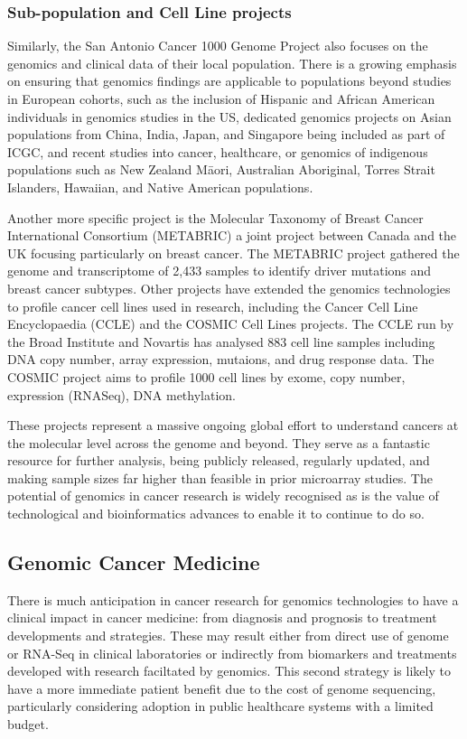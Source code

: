 \subsubsection{Sub-population and Cell Line projects}
Similarly, the San Antonio Cancer 1000 Genome Project also focuses on the genomics and clinical data of their local population. There is a growing emphasis on ensuring that genomics findings are applicable to populations beyond studies in European cohorts, such as the inclusion of Hispanic and African American individuals in genomics studies in the US, dedicated genomics projects on Asian populations from China, India, Japan, and Singapore being included as part of ICGC, and recent studies into cancer, healthcare, or genomics of indigenous populations such as New Zealand  M\={a}ori, Australian Aboriginal, Torres Strait Islanders, Hawaiian, and Native American populations. 

Another more specific project is the Molecular Taxonomy of Breast Cancer International Consortium (METABRIC) a joint project between Canada and the UK focusing particularly on breast cancer. The METABRIC project gathered the genome and transcriptome of 2,433 samples to identify driver mutations and breast cancer subtypes. Other projects have extended the genomics technologies to profile cancer cell lines used in research, including the Cancer Cell Line Encyclopaedia (CCLE) and the COSMIC Cell Lines projects. The CCLE run by the Broad Institute and Novartis has analysed 883 cell line samples including DNA copy number, array expression, mutaions, and  drug response data. The COSMIC project aims to profile 1000 cell lines by exome, copy number, expression (RNASeq), DNA methylation.

These projects represent a massive ongoing global effort to understand cancers at the molecular level across the genome and beyond. They serve as a fantastic resource for further analysis, being publicly released, regularly updated, and making sample sizes far higher than feasible in prior microarray studies. The potential of genomics in cancer research is widely recognised as is the value of technological and bioinformatics advances to enable it to continue to do so. 


\subsection{Genomic Cancer Medicine}
There is much anticipation in cancer research for genomics technologies to have a clinical impact in cancer medicine: from diagnosis and prognosis to treatment developments and strategies. These may result either from direct use of genome or RNA-Seq in clinical laboratories or indirectly from biomarkers and treatments developed with research faciltated by genomics. This second strategy is likely to have a more immediate patient benefit due to the cost of genome sequencing, particularly considering adoption in public healthcare systems with a limited budget.  

